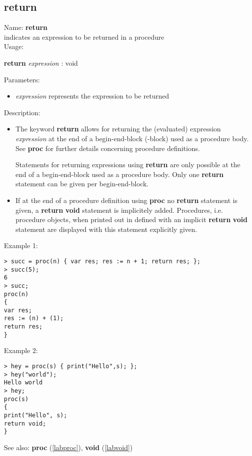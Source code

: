 \subsection{return}
\label{labreturn}
\noindent Name: \textbf{return}\\
\phantom{aaa}indicates an expression to be returned in a procedure\\[0.2cm]
\noindent Usage: 
\begin{center}
\textbf{return} \emph{expression} : \textsf{void}\\
\end{center}
Parameters: 
\begin{itemize}
\item \emph{expression} represents the expression to be returned
\end{itemize}
\noindent Description: \begin{itemize}

\item The keyword \textbf{return} allows for returning the (evaluated) expression
   \emph{expression} at the end of a begin-end-block ({}-block) used as a
   \sollya procedure body. See \textbf{proc} for further details concerning
   \sollya procedure definitions.
     
   Statements for returning expressions using \textbf{return} are only possible
    at the end of a begin-end-block used as a \sollya procedure
    body. Only one \textbf{return} statement can be given per begin-end-block.

\item If at the end of a procedure definition using \textbf{proc} no \textbf{return}
   statement is given, a \textbf{return} \textbf{void} statement is implicitely
   added. Procedures, i.e. procedure objects, when printed out in \sollya
   defined with an implicit \textbf{return} \textbf{void} statement are displayed with
   this statement explicitly given.
\end{itemize}
\noindent Example 1: 
\begin{center}\begin{minipage}{15cm}\begin{Verbatim}[frame=single,commandchars=\\\|\~]
> succ = proc(n) { var res; res := n + 1; return res; };
> succ(5);
6
> succ;
proc(n)
{
var res;
res := (n) + (1);
return res;
}
\end{Verbatim}
\end{minipage}\end{center}
\noindent Example 2: 
\begin{center}\begin{minipage}{15cm}\begin{Verbatim}[frame=single,commandchars=\\\|\~]
> hey = proc(s) { print("Hello",s); };
> hey("world");
Hello world
> hey;
proc(s)
{
print("Hello", s);
return void;
}
\end{Verbatim}
\end{minipage}\end{center}
See also: \textbf{proc} (\ref{labproc}), \textbf{void} (\ref{labvoid})
